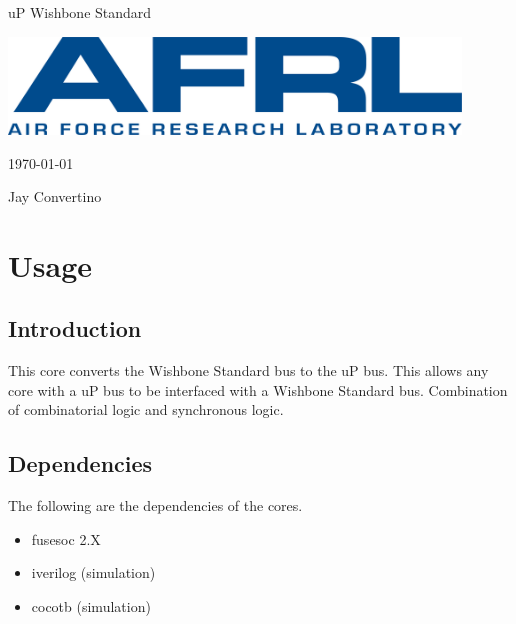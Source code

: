 \begin{titlepage}
  \begin{center}

  {\Huge uP Wishbone Standard}

  \vspace{25mm}

  \includegraphics[width=0.90\textwidth,height=\textheight,keepaspectratio]{img/AFRL.png}

  \vspace{25mm}

  \today

  \vspace{15mm}

  {\Large Jay Convertino}

  \end{center}
\end{titlepage}

\tableofcontents

\newpage

\section{Usage}

\subsection{Introduction}

\par
This core converts the Wishbone Standard bus to the uP bus. This allows any core with a uP bus to be interfaced with a Wishbone Standard bus. Combination of combinatorial logic and synchronous logic.

\subsection{Dependencies}

\par
The following are the dependencies of the cores.

\begin{itemize}
  \item fusesoc 2.X
  \item iverilog (simulation)
  \item cocotb (simulation)
\end{itemize}

